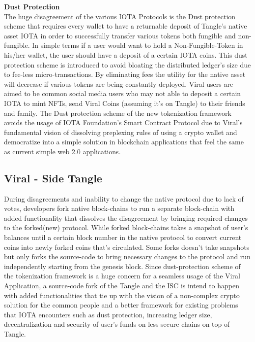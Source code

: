 \documentclass[10pt]{article}
\begin{document}
\textbf{Dust Protection}\\

The huge disagreement of the various IOTA Protocols is the Dust protection scheme that requires every wallet to have a returnable deposit of Tangle's native asset IOTA in order to successfully transfer various tokens both fungible and non-fungible. In simple terms if a user would want to hold a Non-Fungible-Token in his/her wallet, the user should have a deposit of a certain IOTA coins. This dust protection scheme is introduced to avoid bloating the distributed ledger's size due to fee-less micro-transactions. By eliminating fees the utility for the native asset will decrease if various tokens are being constantly deployed. Viral users are aimed to be common social media users who may not able to deposit a certain IOTA to mint NFTs, send Viral Coins (assuming it's on Tangle) to their friends and family. The Dust protection scheme of the new tokenization framework avoids the usage of IOTA Foundation's Smart Contract Protocol due to Viral's fundamental vision of dissolving preplexing rules of using a crypto wallet and democratize into a simple solution in blockchain applications that feel the same as current simple web 2.0 applications.

\subsection{Viral - Side Tangle}

During disagreements and inability to change the native protocol due to lack of votes, developers fork native block-chains to run a separate block-chain with added functionality that dissolves the disagreement by bringing required changes to the forked(new) protocol. While forked block-chains takes a snapshot of user's balances until a certain block number in the native protocol to convert current coins into newly forked coins that's circulated. Some forks doesn't take snapshots but only forks the source-code to bring necessary changes to the protocol and run independently starting from the genesis block. Since dust-protection scheme of the tokenization framework is a huge concern for a seamless usage of the Viral Application, a source-code fork of the Tangle and the ISC is intend to happen with added functionalities that tie up with the vision of a non-complex crypto solution for the common people and a better framework for existing problems that IOTA encounters such as dust protection, increasing ledger size, decentralization and security of user's funds on less secure chains on top of Tangle.
\end{document}
